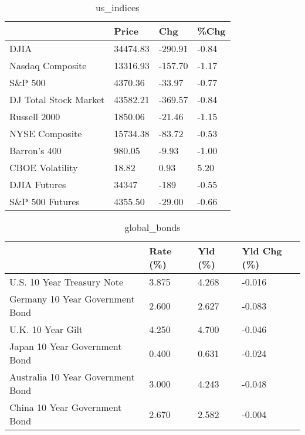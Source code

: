 \documentclass{article}%
\begin{document}
%


\begin{table}[htbp]%
\caption{us\_indices}%
\centering%
\begin{adjustbox}{width=1\textwidth}%
\begin{tabular}{llll}
\toprule
                      &    Price &     Chg &  \%Chg \\
\midrule
                 DJIA & 34474.83 & -290.91 & -0.84 \\
     Nasdaq Composite & 13316.93 & -157.70 & -1.17 \\
              S\&P 500 &  4370.36 &  -33.97 & -0.77 \\
DJ Total Stock Market & 43582.21 & -369.57 & -0.84 \\
         Russell 2000 &  1850.06 &  -21.46 & -1.15 \\
       NYSE Composite & 15734.38 &  -83.72 & -0.53 \\
         Barron's 400 &   980.05 &   -9.93 & -1.00 \\
      CBOE Volatility &    18.82 &    0.93 &  5.20 \\
         DJIA Futures &    34347 &    -189 & -0.55 \\
      S\&P 500 Futures &  4355.50 &  -29.00 & -0.66 \\
\bottomrule
\end{tabular}
%
\end{adjustbox}%
\end{table}

%


\begin{table}[htbp]%
\caption{global\_bonds}%
\centering%
\begin{adjustbox}{width=1\textwidth}%
\begin{tabular}{llll}
\toprule
                                  & Rate (\%) & Yld (\%) & Yld Chg (\%) \\
\midrule
       U.S. 10 Year Treasury Note &    3.875 &   4.268 &      -0.016 \\
  Germany 10 Year Government Bond &    2.600 &   2.627 &      -0.083 \\
                U.K. 10 Year Gilt &    4.250 &   4.700 &      -0.046 \\
    Japan 10 Year Government Bond &    0.400 &   0.631 &      -0.024 \\
Australia 10 Year Government Bond &    3.000 &   4.243 &      -0.048 \\
    China 10 Year Government Bond &    2.670 &   2.582 &      -0.004 \\
\bottomrule
\end{tabular}
%
\end{adjustbox}%
\end{table}
\end{document}
